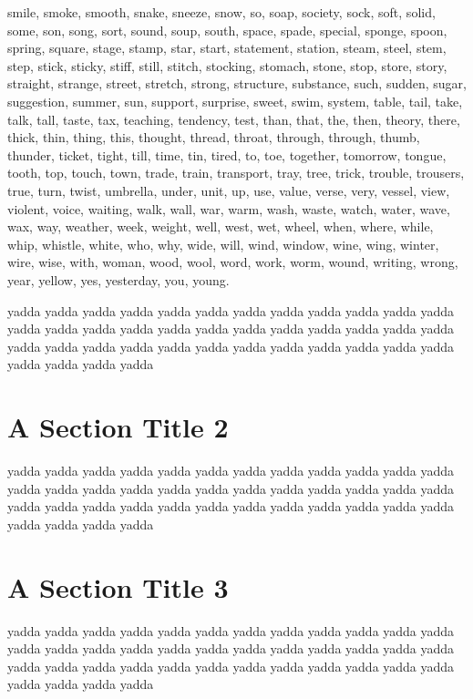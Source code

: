 \begin{multicols}{2}
smile, smoke, smooth, snake, sneeze, snow, so, soap, society, sock, soft,
solid, some, son, song, sort, sound, soup, south, space, spade, special,
sponge, spoon, spring, square, stage, stamp, star, start, statement, station,
steam, steel, stem, step, stick, sticky, stiff, still, stitch, stocking,
stomach, stone, stop, store, story, straight, strange, street, stretch,
strong, structure, substance, such, sudden, sugar, suggestion, summer, sun,
support, surprise, sweet, swim, system, table, tail, take, talk, tall, taste,
tax, teaching, tendency, test, than, that, the, then, theory, there, thick,
thin, thing, this, thought, thread, throat, through, through, thumb, thunder,
ticket, tight, till, time, tin, tired, to, toe, together, tomorrow, tongue,
tooth, top, touch, town, trade, train, transport, tray, tree, trick, trouble,
trousers, true, turn, twist, umbrella, under, unit, up, use, value, verse,
very, vessel, view, violent, voice, waiting, walk, wall, war, warm, wash,
waste, watch, water, wave, wax, way, weather, week, weight, well, west, wet,
wheel, when, where, while, whip, whistle, white, who, why, wide, will, wind,
window, wine, wing, winter, wire, wise, with, woman, wood, wool, word, work,
worm, wound, writing, wrong, year, yellow, yes, yesterday, you, young.\mktsShowpar\par
yadda yadda yadda yadda yadda yadda yadda yadda yadda yadda
yadda yadda yadda yadda yadda yadda yadda yadda yadda yadda
yadda yadda yadda yadda yadda yadda yadda yadda yadda yadda
yadda yadda yadda yadda yadda yadda yadda yadda yadda yadda\mktsShowpar\par
\end{multicols}
\section{A Section Title 2 
}
\begin{multicols}{2}yadda yadda yadda yadda yadda yadda yadda yadda yadda yadda
yadda yadda yadda yadda yadda yadda yadda yadda yadda yadda
yadda yadda yadda yadda yadda yadda yadda yadda yadda yadda
yadda yadda yadda yadda yadda yadda yadda yadda yadda yadda\mktsShowpar\par
\end{multicols}
\section{A Section Title 3 
}
\begin{multicols}{2}yadda yadda yadda yadda yadda yadda yadda yadda yadda yadda
yadda yadda yadda yadda yadda yadda yadda yadda yadda yadda
yadda yadda yadda yadda yadda yadda yadda yadda yadda yadda
yadda yadda yadda yadda yadda yadda yadda yadda yadda yadda\mktsShowpar\par
\end{multicols}
